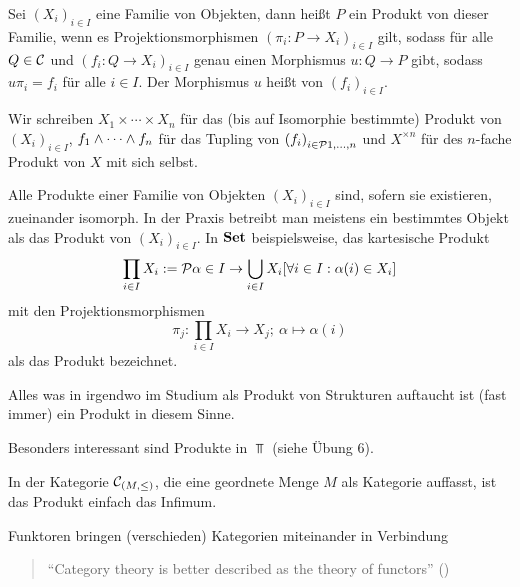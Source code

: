 \documentclass{book}
\begin{document}
\begin{definition}
    Sei ${(X_i)}_{i\in I}$ eine Familie von Objekten, dann heißt $P$ ein Produkt von dieser Familie, wenn es Projektionsmorphismen ${(\pi_i:P\to X_i)}_{i\in I}$ gilt, sodass für alle $Q\in\mathcal{C}$ und ${(f_i:Q\to X_i)}_{i\in I}$ genau einen Morphismus $u:Q\to P$ gibt, sodass $u\pi_i=f_i$ für alle $i\in I$. Der Morphismus $u$ heißt  von ${(f_i)}_{i\in I}$.
\end{definition}

\begin{remark}
    Wir schreiben $X_1\times\cdots\times X_n$ für das (bis auf Isomorphie bestimmte) Produkt von ${(X_i)}_{i\in I}$, $f_1\wedge\cdots\wedge f_n$ für das Tupling von ${(f_i)}_{i\in\set{1,\ldots,n}}$ und $X^{\times n}$ für des $n$-fache Produkt von $X$ mit sich selbst.
\end{remark}

\begin{remark}
    Alle Produkte einer Familie von Objekten ${(X_i)}_{i\in I}$ sind, sofern sie existieren, zueinander isomorph. In der Praxis betreibt man meistens ein bestimmtes Objekt als das Produkt von ${(X_i)}_{i\in I}$. In $\mathbf{Set}$ beispielsweise, das kartesische Produkt
    $$
    \prod_{i\in I}{X_i}:=\set{\alpha\in I\to\Setjoin_{i\in I}{X_i}}[\forall i\in I:\alpha(i)\in X_i]
    $$
    mit den Projektionsmorphismen
    $$
    \pi_j:\prod_{i\in I}{X_i}\to X_j;\ \alpha\mapsto \alpha(i)
    $$
    als das Produkt bezeichnet.
\end{remark}

\begin{example}
    Alles was in irgendwo im Studium als Produkt von Strukturen auftaucht ist (fast immer) ein Produkt in diesem Sinne.
\end{example}

\begin{example}
    Besonders interessant sind Produkte in $\Top$ (siehe Übung 6).%
\end{example}

\begin{example}
    In der Kategorie $\mathcal{C}_{(M,\leq)}$, die eine geordnete Menge $M$ als Kategorie auffasst, ist das Produkt einfach das Infimum.
\end{example}

Funktoren bringen (verschieden) Kategorien miteinander in Verbindung

\begin{quotation}
    ``Category theory is better described as the theory of functors'' ()
\end{quotation}
\end{document}
